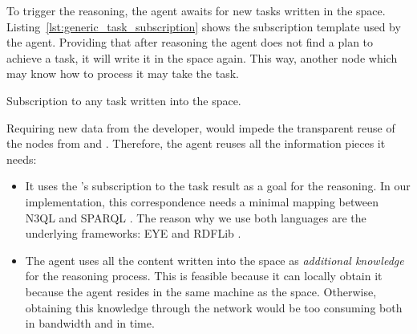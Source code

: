 To trigger the reasoning, the agent awaits for new tasks written in the space.
Listing~\ref{lst:generic_task_subscription} shows the subscription template used by the agent.
Providing that after reasoning the agent does not find a plan to achieve a task, it will write it in the space again.
This way, another node which may know how to process it may take the task. %


\begin{listing}
  
  \caption{Subscription to any task written into the space.}
  \label{lst:generic_task_subscription}
\end{listing}


Requiring new data from the developer, would impede the transparent reuse of the nodes from \implSpace{} and \implRest{}.
Therefore, the agent reuses all the information pieces it needs:
\begin{itemize}
  \item It uses the \nodeConsSpace{}'s subscription to the task result as a goal for the reasoning.
	In our implementation, this correspondence needs a minimal mapping between N3QL  and SPARQL .
	The reason why we use both languages are the underlying frameworks: EYE  and RDFLib .
	
  \item The agent uses all the content written into the space as \emph{additional knowledge} for the reasoning process.
	This is feasible because it can locally obtain it because the agent resides in the same machine as the space.
	Otherwise, obtaining this knowledge through the network would be too consuming both in bandwidth and in time.
\end{itemize}


